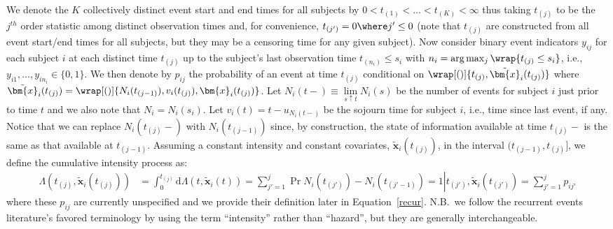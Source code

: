 \documentclass[article]{jss}
\begin{document}
We denote the $K$ collectively distinct event start and end times for
all subjects by $0<t_{(1)}< \dots< t_{(K)}<\infty$ thus taking
$t_{(j)}$ to be the $j^{th}$ order statistic among distinct
observation times and, for convenience, $t_{(j')}=0 \where j' \le 0$
(note that $t_{(j)}$ are constructed from all event start/end times
for all subjects,
but they may be a censoring time for any given subject).  Now consider
binary event indicators $y_{ij}$ for each subject $i$ at each distinct
time $t_{(j)}$ up to %
the subject's last observation time $t_{(n_i)} \le s_{i}$ with
$n_i=\arg \max_j \wrap{ t_{(j)}\leq s_{i}}$, i.e.,
$y_{i1}, \dots, y_{in_i} \in \{0, 1\}$.  We then denote by $p_{ij}$
the probability of an event at time $t_{(j)}$ conditional on
$\wrap[()]{t_{(j)}, \tilde{\bm{x}}_i(t_{(j)})}$ where
$\tilde{\bm{x}}_i(t_{(j)})=\wrap[()]{ N_i(t_{(j-1)}), v_i(t_{(j)}),
  \bm{x}_i(t_{(j)})}$.
Let $N_i(t-) \equiv \lim\limits_{s\uparrow t} N_i(s)$ be the number of
events for subject $i$ just prior to time $t$ and we also note that
$N_i=N_i(s_i)$.  Let $v_i(t)=t-u_{N_i(t-)}$ be the sojourn time for
subject $i$, i.e., time since last event, if any.  Notice that we can
replace $N_i(t_{(j)}-)$ with $N_i(t_{(j-1)})$ since, by construction,
the state of information available at time $t_{(j)}-$ is the same as
that available at $t_{(j-1)}$.
Assuming a constant intensity and constant covariates,
$\tilde{\bm{x}}_i(t_{(j)})$, in the interval $(t_{(j-1)} , t_{(j)}]$, we
define the cumulative intensity process as:
\begin{align}\label{cum-int}
\Lambda(t_{(j)}, \tilde{\bm{x}}_i(t_{(j)})) &
= \int_0^{ t_{(j)}} \mathrm{d} \Lambda(t, \tilde{\bm{x}}_i(t)) 
 = \sum_{j'=1}^j \Pr{N_i(t_{(j')})-N_i(t_{(j'-1)})=1\left|\right. t_{(j')}, \tilde{\bm{x}}_i(t_{(j')})} 
  =\sum_{j'=1}^j p_{ij'} 
\end{align}
where these $p_{ij}$ are currently unspecified and we provide their
definition later in Equation~\ref{recur}.  N.B.\ we follow the
recurrent events literature's favored terminology by using the term
``intensity'' rather than ``hazard'', but they are generally
interchangeable.
\end{document}
